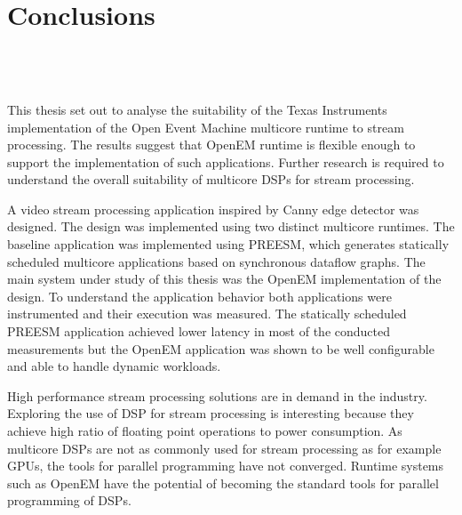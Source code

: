 \chapter{Conclusions}
\label{chapter:conclusion}
 \\
 \\
 \\
This thesis set out to analyse the suitability of the Texas Instruments implementation of the Open Event Machine multicore runtime to stream processing. The results suggest that OpenEM runtime is flexible enough to support the implementation of such applications. Further research is required to understand the overall suitability of multicore DSPs for stream processing.

A video stream processing application inspired by Canny edge detector was designed. The design was implemented using two distinct multicore runtimes. The baseline application was implemented using PREESM, which generates statically scheduled multicore applications based on synchronous dataflow graphs. The main system under study of this thesis was the OpenEM implementation of the design. To understand the application behavior both applications were instrumented and their execution was measured. The statically scheduled PREESM application achieved lower latency in most of the conducted measurements but the OpenEM application was shown to be well configurable and able to handle dynamic workloads.

High performance stream processing solutions are in demand in the industry. Exploring the use of DSP for stream processing is interesting because they achieve high ratio of floating point operations to power consumption. As multicore DSPs are not as commonly used for stream processing as for example GPUs, the tools for parallel programming have not converged. Runtime systems such as OpenEM have the potential of becoming the standard tools for parallel programming of DSPs.
